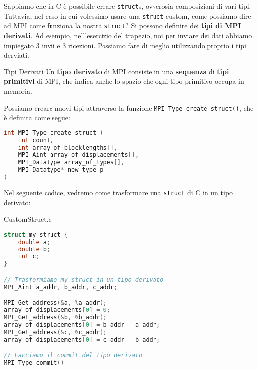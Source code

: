 Sappiamo che in C è possibile creare \verb|struct|s, ovverosia composizioni di vari tipi. Tuttavia, nel caso in cui volessimo usare una \verb|struct| custom, come possiamo dire ad MPI come funziona la nostra \verb|struct|? Si possono definire dei \textbf{tipi di MPI derivati}. Ad esempio, nell'esercizio del trapezio, noi per inviare dei dati abbiamo impiegato 3 invii e 3 ricezioni. Possiamo fare di meglio utilizzando proprio i tipi derviati.

\begin{definition}{Tipi Derivati}
    Un \textbf{tipo derivato} di MPI consiste in una \textbf{sequenza} di \textbf{tipi primitivi} di MPI, che indica anche lo spazio che ogni tipo primitivo occupa in memoria.
\end{definition}

Possiamo creare nuovi tipi attraverso la funzione \verb|MPI_Type_create_struct()|, che è definita come segue:

\begin{codedefine}
    \begin{lstlisting}[language = C, numbers = none]
int MPI_Type_create_struct (
    int count,
    int array_of_blocklengths[],
    MPI_Aint array_of_displacements[],
    MPI_Datatype array_of_types[],
    MPI_Datatype* new_type_p
)\end{lstlisting}
\tcblower
\end{codedefine}

Nel seguente codice, vedremo come trasformare una \verb|struct| di C in un tipo derivato:

\begin{codeblock}{CustomStruct.c}
    \begin{lstlisting}[language = C, numbers = none, columns=fullflexible]
struct my_struct {
    double a;
    double b;
    int c;
}

// Trasformiamo my_struct in un tipo derivato
MPI_Aint a_addr, b_addr, c_addr;

MPI_Get_address(&a, %a_addr);
array_of_displacements[0] = 0;
MPI_Get_address(&b, %b_addr);
array_of_displacements[0] = b_addr - a_addr;
MPI_Get_address(&c, %c_addr);
array_of_displacements[0] = c_addr - b_addr;

// Facciamo il commit del tipo derivato
MPI_Type_commit()
    \end{lstlisting}
\end{codeblock}